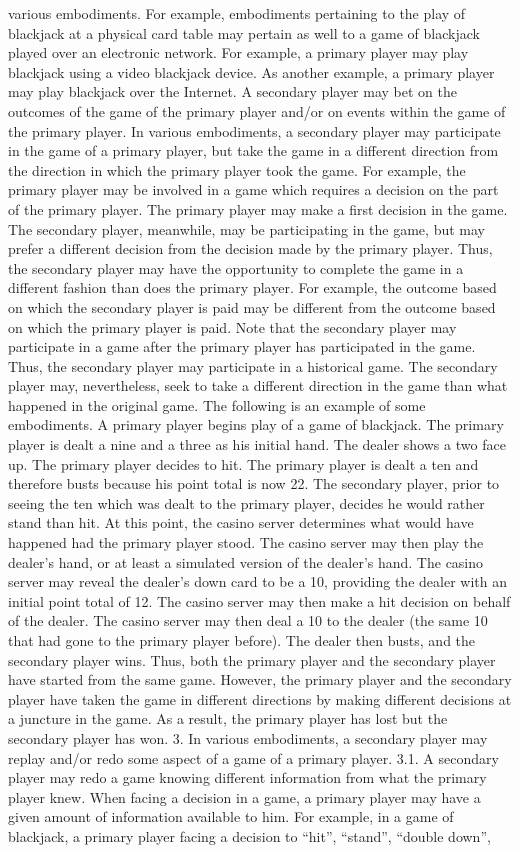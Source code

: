 \documentclass[11pt,a4paper]{article}
\begin{document}
various embodiments. For example, embodiments pertaining to the play of blackjack at a physical card table may pertain as well to a game of blackjack played over an electronic network. For example, a primary player may play blackjack using a video blackjack device. As another example, a primary player may play blackjack over the Internet. A secondary player may bet on the outcomes of the game of the primary player and/or on events within the game of the primary player. In various embodiments, a secondary player may participate in the game of a primary player, but take the game in a different direction from the direction in which the primary player took the game. For example, the primary player may be involved in a game which requires a decision on the part of the primary player. The primary player may make a first decision in the game. The secondary player, meanwhile, may be participating in the game, but may prefer a different decision from the decision made by the primary player. Thus, the secondary player may have the opportunity to complete the game in a different fashion than does the primary player. For example, the outcome based on which the secondary player is paid may be different from the outcome based on which the primary player is paid. Note that the secondary player may participate in a game after the primary player has participated in the game. Thus, the secondary player may participate in a historical game. The secondary player may, nevertheless, seek to take a different direction in the game than what happened in the original game. The following is an example of some embodiments. A primary player begins play of a game of blackjack. The primary player is dealt a nine and a three as his initial hand. The dealer shows a two face up. The primary player decides to hit. The primary player is dealt a ten and therefore busts because his point total is now 22. The secondary player, prior to seeing the ten which was dealt to the primary player, decides he would rather stand than hit. At this point, the casino server determines what would have happened had the primary player stood. The casino server may then play the dealer's hand, or at least a simulated version of the dealer's hand. The casino server may reveal the dealer's down card to be a 10, providing the dealer with an initial point total of 12. The casino server may then make a hit decision on behalf of the dealer. The casino server may then deal a 10 to the dealer (the same 10 that had gone to the primary player before). The dealer then busts, and the secondary player wins. Thus, both the primary player and the secondary player have started from the same game. However, the primary player and the secondary player have taken the game in different directions by making different decisions at a juncture in the game. As a result, the primary player has lost but the secondary player has won. 3. In various embodiments, a secondary player may replay and/or redo some aspect of a game of a primary player. 3.1. A secondary player may redo a game knowing different information from what the primary player knew. When facing a decision in a game, a primary player may have a given amount of information available to him. For example, in a game of blackjack, a primary player facing a decision to “hit”, “stand”, “double down”, 
\end{document}
